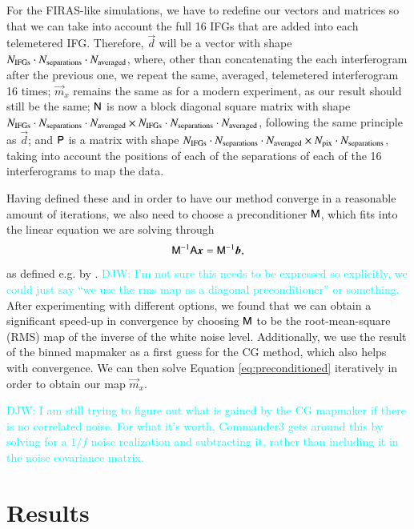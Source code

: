 \documentclass{aa}
\newcommand{\dv}[0]{\vec{d}}
\newcommand{\A}[0]{\tens{A}}
\newcommand{\m}[0]{\vec{m}}
\newcommand{\N}[0]{\tens{N}}
\newcommand{\M}[0]{\tens{M}}
\newcommand{\matP}[0]{\tens{P}}
\newcommand{\x}{\vec{x}}
\renewcommand{\b}{\vec{b}}
\newcommand{\djw}[1]{\textcolor{cyan}{{DJW:} #1}}
\begin{document}
For the FIRAS-like simulations, we have to redefine our vectors and matrices so that we can take into account the full 16 IFGs that are added into each telemetered IFG. Therefore, $\dv$ will be a vector with shape $N_{\rm IFGs} \cdot N_{\rm separations} \cdot N_{\rm averaged}$, where, other than concatenating the each interferogram after the previous one, we repeat the same, averaged, telemetered interferogram 16 times; $\m_x$ remains the same as for a modern experiment, as our result should still be the same; $\N$ is now a block diagonal square matrix with shape $N_{\rm IFGs} \cdot N_{\rm separations} \cdot N_{\rm averaged} \times N_{\rm IFGs} \cdot N_{\rm separations} \cdot N_{\rm averaged}$, following the same principle as $\dv$; and $\matP$ is a matrix with shape $N_{\rm IFGs} \cdot N_{\rm separations} \cdot N_{\rm averaged} \times N_{\rm pix} \cdot N_{\rm separations}$, taking into account the positions of each of the separations of each of the 16 interferograms to map the data.

Having defined these and in order to have our method converge in a reasonable amount of iterations, we also need to choose a preconditioner $\M$, which fits into the linear equation we are solving through
\begin{equation}
    \label{eq:preconditioned}
    \M^{-1} \A \x = \M^{-1} \b,
\end{equation}
as defined e.g. by \cite{shewchuk:1994}. \djw{I'm not sure this needs to be expressed so explicitly, we could just say ``we use the rms map as a diagonal preconditioner'' or something.} After experimenting with different options, we found that we can obtain a significant speed-up in convergence by choosing $\M$ to be the root-mean-square (RMS) map of the inverse of the white noise level. Additionally, we use the result of the binned mapmaker as a first guess for the CG method, which also helps with convergence. We can then solve Equation \eqref{eq:preconditioned} iteratively in order to obtain our map $\m_x$.



\djw{I am still trying to figure out what is gained by the CG mapmaker if there is no correlated noise. For what it's worth, Commander3 gets around this by solving for a $1/f$ noise realization and subtracting it, rather than including it in the noise covariance matrix.}


\section{Results}
\label{sec:results}
\end{document}
